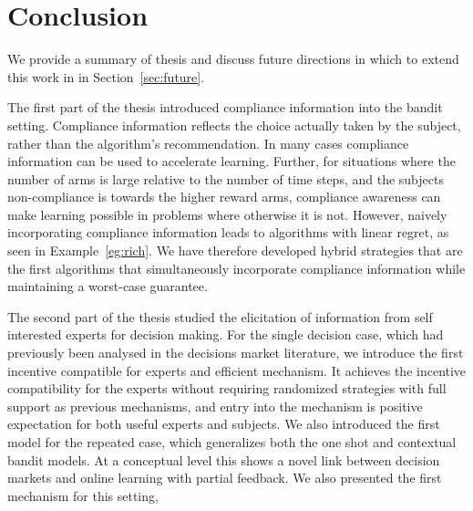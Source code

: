 \chapter{Conclusion}
\label{cha:conc}

We provide a summary of thesis and discuss future directions in which to extend this work in in Section~\ref{sec:future}.

The first part of the thesis introduced compliance information into the bandit setting. 
Compliance information reflects the choice actually taken by the subject, rather than the algorithm's recommendation. 
In many cases compliance information can be used to accelerate learning.
Further, for situations where the number of arms is large relative to the number of time steps, and the subjects non-compliance is towards the higher reward arms, compliance awareness can make learning possible in problems where otherwise it is not. 
However, naively incorporating compliance information leads to algorithms with linear regret, as seen in Example~\ref{eg:rich}. 
We have therefore developed hybrid strategies that are the first algorithms that simultaneously incorporate compliance information while maintaining a worst-case guarantee. 

The second part of the thesis studied the elicitation of information from self interested experts for decision making.
For the single decision case, which had previously been analysed in the decisions market literature, we introduce the first incentive compatible for experts and efficient mechanism.
It achieves the incentive compatibility for the experts without requiring randomized strategies with full support as previous mechanisms, and entry into the mechanism is positive expectation for both useful experts and subjects.
We also introduced the first model for the repeated case, which generalizes both the one shot and contextual bandit models.
At a conceptual level this shows a novel link between decision markets and online learning with partial feedback.
We also presented the first mechanism for this setting, 




